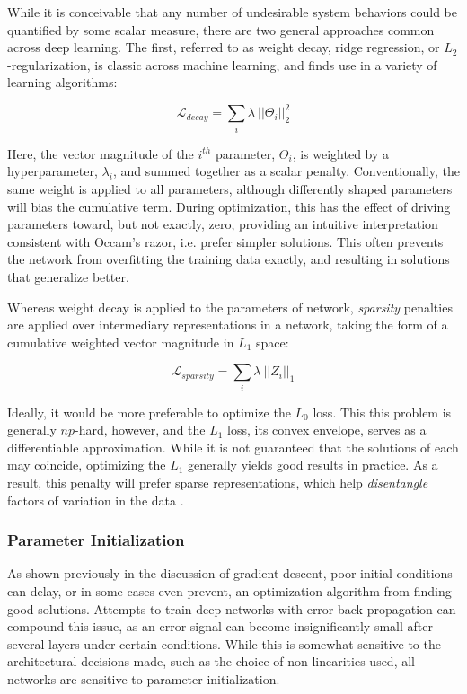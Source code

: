 While it is conceivable that any number of undesirable system behaviors could be quantified by some scalar measure, there are two general approaches common across deep learning.
The first, referred to as weight decay, ridge regression, or $L_2$-regularization, is classic across machine learning, and finds use in a variety of learning algorithms:

\begin{equation}
\mathcal{L}_{decay}=\sum_i\lambda~||\Theta_i||_2^2
\end{equation}

Here, the vector magnitude of the $i^{th}$ parameter, $\Theta_i$, is weighted by a hyperparameter, $\lambda_i$, and summed together as a scalar penalty.
Conventionally, the same weight is applied to all parameters, although differently shaped parameters will bias the cumulative term.
During optimization, this has the effect of driving parameters toward, but not exactly, zero, providing an intuitive interpretation consistent with Occam's razor, i.e. prefer simpler solutions.
This often prevents the network from overfitting the training data exactly, and resulting in solutions that generalize better.

Whereas weight decay is applied to the parameters of network, \emph{sparsity} penalties are applied over intermediary representations in a network, taking the form of a cumulative weighted vector magnitude in $L_1$ space:

\begin{equation}
\mathcal{L}_{sparsity}=\sum_i\lambda~||Z_i||_1
\end{equation}

\noindent Ideally, it would be more preferable to optimize the $L_0$ loss.
This this problem is generally $np$-hard, however, and the $L_1$ loss, its convex envelope, serves as a differentiable approximation.
While it is not guaranteed that the solutions of each may coincide, optimizing the $L_1$ generally yields good results in practice.
As a result, this penalty will prefer sparse representations, which help \emph{disentangle} factors of variation in the data \cite{Bengio2009Learning}.


\subsubsection{Parameter Initialization}

As shown previously in the discussion of gradient descent, poor initial conditions can delay, or in some cases even prevent, an optimization algorithm from finding good solutions.
Attempts to train deep networks with error back-propagation can compound this issue, as an error signal can become insignificantly small after several layers under certain conditions.
While this is somewhat sensitive to the architectural decisions made, such as the choice of non-linearities used, all networks are sensitive to parameter initialization.

